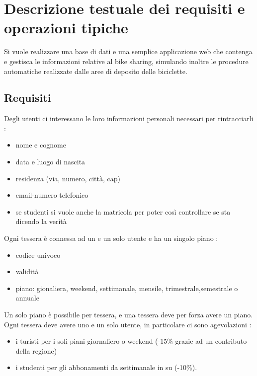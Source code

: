 \documentclass[a4paper,twoside]{article}
\begin{document}
\section{Descrizione testuale dei requisiti e operazioni tipiche}
Si vuole realizzare una base di dati e una semplice applicazione web che contenga e gestisca le informazioni relative al
bike sharing, simulando inoltre le procedure automatiche realizzate dalle aree di deposito delle biciclette.


\subsection{Requisiti}
Degli utenti ci interessano le loro informazioni personali necessari per rintracciarli :
\begin{itemize}
 \item nome e cognome
 \item data e luogo di nascita
 \item residenza (via, numero, città, cap)
 \item email-numero telefonico
 \item se studenti si vuole anche la matricola per poter così controllare se sta dicendo la verità
\end{itemize}
Ogni tessera è connessa ad un e un solo utente e ha un singolo piano :
\begin{itemize}
 \item codice univoco
 \item validità
 \item piano: gionaliera, weekend, settimanale, mensile, trimestrale,semestrale o annuale
\end{itemize}
Un solo piano è possibile per tessera, e una tessera deve per forza avere un piano.\newline
Ogni tessera deve avere uno e un solo utente, in particolare ci sono agevolazioni :
\begin{itemize}
 \item  i turisti per i soli piani giornaliero o weekend (-15\% grazie ad un contributo della regione)
 \item i studenti per gli abbonamenti da settimanale in su (-10\%).
\end{itemize}
\end{document}
